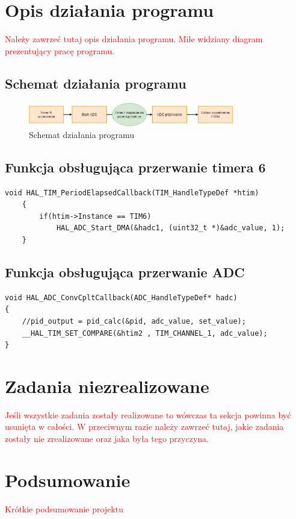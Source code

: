 \documentclass[10pt, a4paper]{article}
\begin{document}
\section{Opis działania programu}
\textcolor{red}{Należy zawrzeć tutaj opis działania programu.
	Mile widziany diagram prezentujący pracę programu.}

\subsection{Schemat działania programu}
	\begin{figure}[H]
		\centering
		\includegraphics[width=0.8\textwidth]{figures/diagramPWM.png}
		\caption{Schemat działania programu}
		\label{fig:diagramPWM}
	\end{figure}

\subsection{Funkcja obsługująca przerwanie timera 6}
	\begin{lstlisting}[tabsize=2]
	void HAL_TIM_PeriodElapsedCallback(TIM_HandleTypeDef *htim)
	{
		if(htim->Instance == TIM6)
			HAL_ADC_Start_DMA(&hadc1, (uint32_t *)&adc_value, 1);
	}
	\end{lstlisting}

\subsection{Funkcja obsługująca przerwanie ADC}
\begin{lstlisting}[tabsize=2]
void HAL_ADC_ConvCpltCallback(ADC_HandleTypeDef* hadc)
{
	//pid_output = pid_calc(&pid, adc_value, set_value);
	__HAL_TIM_SET_COMPARE(&htim2 , TIM_CHANNEL_1, adc_value);
}
\end{lstlisting}

\section{Zadania niezrealizowane}
\textcolor{red}{Jeśli wszystkie zadania zostały realizowane to wówczas 
	ta sekcja powinna być usunięta w całości. W przeciwnym razie
	należy zawrzeć tutaj, jakie zadania zostały nie zrealizowane 
	oraz jaka była tego przyczyna.
}

\section{Podsumowanie}
\textcolor{red}{Krótkie podsumowanie projektu}


\newpage
{}


\end{document}
